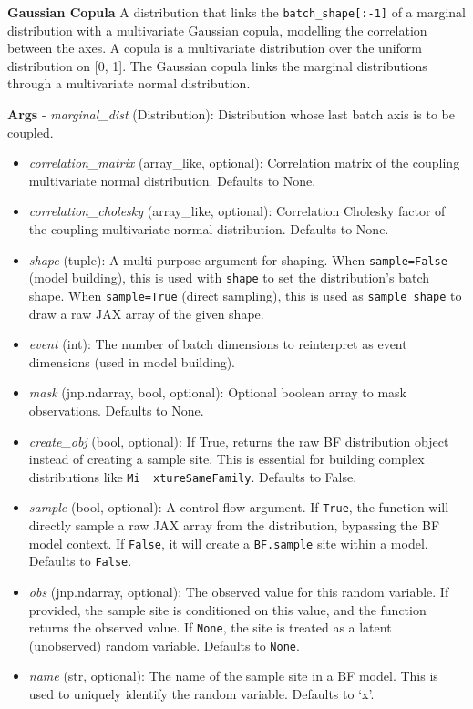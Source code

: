 \documentclass[
  letterpaper,
  DIV=11,
  numbers=noendperiod]{scrartcl}
\begin{document}
\textbf{Gaussian Copula} A distribution that links the
\texttt{batch\_shape{[}:-1{]}} of a marginal distribution with a
multivariate Gaussian copula, modelling the correlation between the
axes. A copula is a multivariate distribution over the uniform
distribution on {[}0, 1{]}. The Gaussian copula links the marginal
distributions through a multivariate normal distribution.

\textbf{Args} - \emph{marginal\_dist} (Distribution): Distribution whose
last batch axis is to be coupled.

\begin{itemize}
\item
  \emph{correlation\_matrix} (array\_like, optional): Correlation matrix
  of the coupling multivariate normal distribution. Defaults to None.
\item
  \emph{correlation\_cholesky} (array\_like, optional): Correlation
  Cholesky factor of the coupling multivariate normal distribution.
  Defaults to None.
\item
  \emph{shape} (tuple): A multi-purpose argument for shaping. When
  \texttt{sample=False} (model building), this is used with
  \texttt{shape} to set the distribution's batch shape. When
  \texttt{sample=True} (direct sampling), this is used as
  \texttt{sample\_shape} to draw a raw JAX array of the given shape.
\item
  \emph{event} (int): The number of batch dimensions to reinterpret as
  event dimensions (used in model building).
\item
  \emph{mask} (jnp.ndarray, bool, optional): Optional boolean array to
  mask observations. Defaults to None.
\item
  \emph{create\_obj} (bool, optional): If True, returns the raw BF
  distribution object instead of creating a sample site. This is
  essential for building complex distributions like
  \texttt{Mi\ \ xtureSameFamily}. Defaults to False.
\item
  \emph{sample} (bool, optional): A control-flow argument. If
  \texttt{True}, the function will directly sample a raw JAX array from
  the distribution, bypassing the BF model context. If \texttt{False},
  it will create a \texttt{BF.sample} site within a model. Defaults to
  \texttt{False}.
\item
  \emph{obs} (jnp.ndarray, optional): The observed value for this random
  variable. If provided, the sample site is conditioned on this value,
  and the function returns the observed value. If \texttt{None}, the
  site is treated as a latent (unobserved) random variable. Defaults to
  \texttt{None}.
\item
  \emph{name} (str, optional): The name of the sample site in a BF
  model. This is used to uniquely identify the random variable. Defaults
  to `x'.
\end{itemize}
\end{document}
